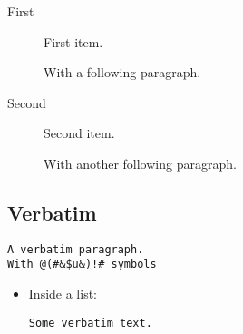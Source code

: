 \documentclass[
  text,
  maruku
]{internet}
\begin{document}
\begin{description}
\item[First] First item.

With a following paragraph.

\item[Second] Second item.

With another following paragraph.
\end{description}

\subsection{Verbatim}

\begin{verbatim}
A verbatim paragraph.
With @(#&$u&)!# symbols
\end{verbatim}

\begin{itemize}
\item Inside a list:

\begin{verbatim}
Some verbatim text.
\end{verbatim}

\end{itemize}
\end{document}
